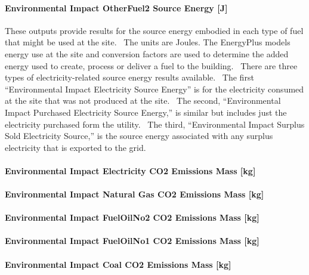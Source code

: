 \paragraph{Environmental Impact OtherFuel2 Source Energy {[}J{]}}\label{environmental-impact-otherfuel2-source-energy-j}

These outputs provide results for the source energy embodied in each type of fuel that might be used at the site.~ The units are Joules. The EnergyPlus models energy use at the site and conversion factors are used to determine the added energy used to create, process or deliver a fuel to the building.~ There are three types of electricity-related source energy results available.~ The first ``Environmental Impact Electricity Source Energy'' is for the electricity consumed at the site that was not produced at the site.~ The second, ``Environmental Impact Purchased Electricity Source Energy,'' is similar but includes just the electricity purchased form the utility.~ The third, ``Environmental Impact Surplus Sold Electricity Source,'' is the source energy associated with any surplus electricity that is exported to the grid.

\paragraph{Environmental Impact Electricity CO2 Emissions Mass {[}kg{]}}\label{environmental-impact-electricity-co2-emissions-mass-kg}

\paragraph{Environmental Impact Natural Gas CO2 Emissions Mass {[}kg{]}}\label{environmental-impact-natural-gas-co2-emissions-mass-kg}

\paragraph{Environmental Impact FuelOilNo2 CO2 Emissions Mass {[}kg{]}}\label{environmental-impact-fuel-oil-2-co2-emissions-mass-kg}

\paragraph{Environmental Impact FuelOilNo1 CO2 Emissions Mass {[}kg{]}}\label{environmental-impact-fuel-oil-1-co2-emissions-mass-kg}

\paragraph{Environmental Impact Coal CO2 Emissions Mass {[}kg{]}}\label{environmental-impact-coal-co2-emissions-mass-kg}

